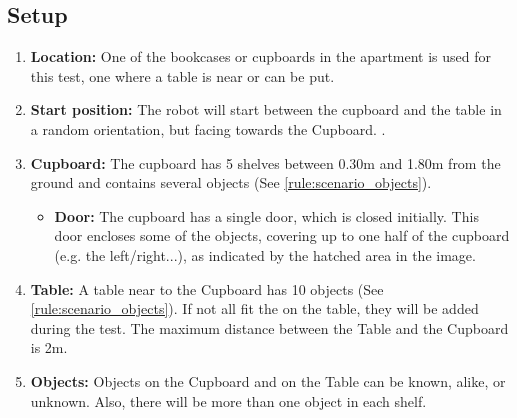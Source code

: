 \begin{minipage}{0.70\textwidth}
	\subsection{Setup}
	\begin{enumerate}
		\item \textbf{Location:} One of the bookcases or cupboards in the apartment is used for this test, one where a table is near or can be put. 
		\item \textbf{Start position:} The robot will start between the cupboard and the table in a random orientation, but facing towards the Cupboard.
		. 
		\item \textbf{Cupboard:} The cupboard has 5 shelves between 0.30m and 1.80m from the ground and contains several objects (See \ref{rule:scenario_objects}).
		\begin{itemize}
		 	\item \textbf{Door:} The cupboard has a single door, which is closed initially.
		 	This door encloses some of the objects, covering up to one half of the cupboard (e.g. the left/right...), as indicated by the hatched area in the image.
		\end{itemize} 
		\item \textbf{Table:} A table near to the Cupboard has 10 objects (See \ref{rule:scenario_objects}). If not all fit the on the table, they will be added during the test. The maximum distance between the Table and the Cupboard is 2m.
		\item \textbf{Objects:} Objects on the Cupboard and on the Table can be known, alike, or unknown. Also, there will be more than one object in each shelf. 
	\end{enumerate}
\end{minipage}\hfill
